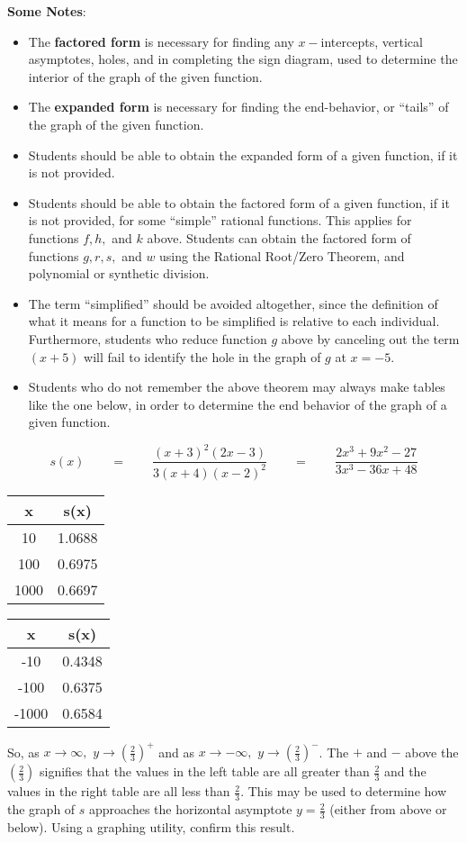 {\bf Some Notes}:
	\begin{itemize}
		\item The {\bf factored form} is necessary for finding any $x-$intercepts, vertical asymptotes, holes, and in completing the sign diagram, used to determine the interior of the graph of the given function.
		\item The {\bf expanded form} is necessary for finding the end-behavior, or ``tails'' of the graph of the given function.
		\item Students should be able to obtain the expanded form of a given function, if it is not provided.
		\item Students should be able to obtain the factored form of a given function, if it is not provided, for some ``simple'' rational functions.  This applies for functions $f,h,$ and $k$ above.  Students can obtain the factored form of functions $g,r,s,$ and $w$ using the Rational Root/Zero Theorem, and polynomial or synthetic division.
		\item The term ``simplified'' should be avoided altogether, since the definition of what it means for a function to be simplified is relative to each individual.  Furthermore, students who reduce function $g$ above by canceling out the term $(x+5)$ will fail to identify the hole in the graph of $g$ at $x=-5$.
		\item Students who do not remember the above theorem may always make tables like the one below, in order to determine the end behavior of the graph of a given function.
	\end{itemize}
$$s(x)\qquad=\qquad\displaystyle\frac{(x+3)^2(2x-3)}{3(x+4)(x-2)^2}\qquad=\qquad\displaystyle\frac{2x^3+9x^2-27}{3x^3-36x+48}$$
\begin{center}
\begin{tabular}{c|c}
x & s(x)\\
\hline
10 & 1.0688\\
100 & 0.6975\\
1000 & 0.6697
\end{tabular}
\qquad\qquad\qquad\qquad
\begin{tabular}{c|c}
x & s(x)\\
\hline
-10 & 0.4348\\
-100 & 0.6375\\
-1000 & 0.6584
\end{tabular}
\end{center}
So, as $x\rightarrow\infty,$ $y\rightarrow\left(\displaystyle\frac{2}{3}\right)^{+}$ and as $x\rightarrow-\infty,$ $y\rightarrow\displaystyle\left(\frac{2}{3}\right)^{-}$.  The $+$ and $-$ above the $\left(\displaystyle\frac{2}{3}\right)$ signifies that the values in the left table are all greater than $\displaystyle\frac{2}{3}$ and the values in the right table are all less than $\displaystyle\frac{2}{3}$.  This may be used to determine how the graph of $s$ approaches the horizontal asymptote $y=\displaystyle\frac{2}{3}$ (either from above or below).  Using a graphing utility, confirm this result.